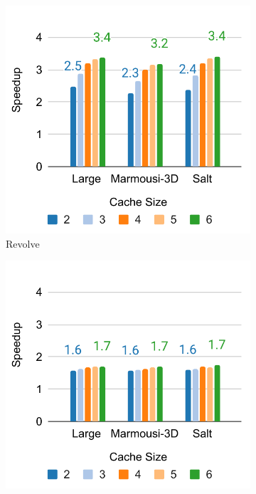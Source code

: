 \documentclass[Ingles,Final]{ic-tese-v3}
\begin{document}
\begin{figure}[h!]
    \centering

    \begin{subfigure}[b]{0.33\textwidth}
        \includegraphics[width=\textwidth]{figures/prefetch_speedup/prefetch_speedup_revolve.pdf}
        \caption{Revolve}
        \label{fig:prefetch_speedup_revolve}
    \end{subfigure}
    \hfill
    \begin{subfigure}[b]{0.33\textwidth}
        \includegraphics[width=\textwidth]{figures/prefetch_speedup/prefetch_speedup_zcut.pdf}

\end{subfigure}
\end{figure}
\end{document}
